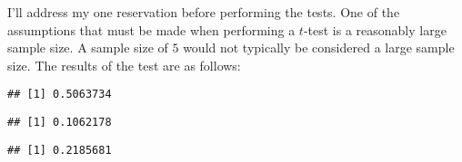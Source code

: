 \documentclass[]{article}
\newenvironment{Shaded}{\begin{snugshade}}{\end{snugshade}}
\newcommand{\KeywordTok}[1]{\textcolor[rgb]{0.13,0.29,0.53}{\textbf{#1}}}
\newcommand{\DataTypeTok}[1]{\textcolor[rgb]{0.13,0.29,0.53}{#1}}
\newcommand{\DecValTok}[1]{\textcolor[rgb]{0.00,0.00,0.81}{#1}}
\newcommand{\FloatTok}[1]{\textcolor[rgb]{0.00,0.00,0.81}{#1}}
\newcommand{\StringTok}[1]{\textcolor[rgb]{0.31,0.60,0.02}{#1}}
\newcommand{\OperatorTok}[1]{\textcolor[rgb]{0.81,0.36,0.00}{\textbf{#1}}}
\newcommand{\NormalTok}[1]{#1}
\begin{document}
I'll address my one reservation before performing the tests. One of the
assumptions that must be made when performing a \(t\)-test is a
reasonably large sample size. A sample size of \(5\) would not typically
be considered a large sample size. The results of the test are as
follows:

\begin{Shaded}
\end{Shaded}

\begin{verbatim}
## [1] 0.5063734
\end{verbatim}

\begin{Shaded}
\end{Shaded}

\begin{verbatim}
## [1] 0.1062178
\end{verbatim}

\begin{Shaded}
\end{Shaded}

\begin{verbatim}
## [1] 0.2185681
\end{verbatim}

\begin{Shaded}
\end{Shaded}
\end{document}
